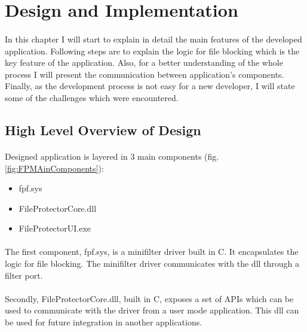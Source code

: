 	\newpage		
	\section{Design and Implementation}
		\paragraph{}
		In this chapter I will start to explain in detail the main features of the developed application. Following steps are to explain the logic for file blocking which is the key feature of the application. Also, for a better understanding of the whole process I will present the communication between application's components. Finally, as the development process is not easy for a new developer, I will state some of the challenges which were encountered.
	
		\subsection{High Level Overview of Design}
		\paragraph{}
		Designed application is layered in 3 main components (fig.\ref{fig:FPMAinComponents}):
		\begin{itemize}
			\item fpf.sys
			\item FileProtectorCore.dll
			\item FileProtectorUI.exe
		\end{itemize}
		
		\paragraph{}
		The first component, fpf.sys, is a minifilter driver built in C. It encapsulates the logic for file blocking. The minifilter driver communicates with the dll through a filter port.
		
		\paragraph{}
		Secondly, FileProtectorCore.dll, built in C, exposes a set of APIs which can be used to communicate with the driver from a user mode application. This dll can be used for future integration in another applications.
		
